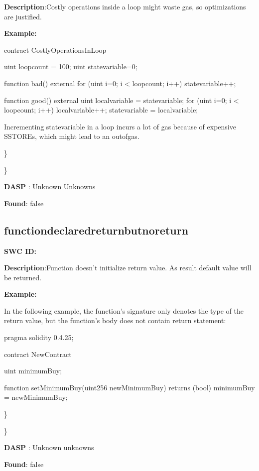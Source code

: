 \documentclass{article}
\begin{document}
{\textbf{Description}:Costly operations inside a loop might waste gas, so optimizations are justified.


\textbf{Example:} 

contract CostlyOperationsInLoop{

    uint loop\textunderscore count = 100;
    uint state\textunderscore variable=0;

    function bad() external{
        for (uint i=0; i < loop\textunderscore count; i++){
            state\textunderscore variable++;
        }
    }

    function good() external{
      uint local\textunderscore variable = state\textunderscore variable;
      for (uint i=0; i < loop\textunderscore count; i++){
        local\textunderscore variable++;
      }
      state\textunderscore variable = local\textunderscore variable;
    }
}
Incrementing state\textunderscore variable in a loop incurs a lot of gas because of expensive SSTOREs, which might lead to an out\textendash of\textendash gas.

\} 

\} 

\textbf{DASP} : Unknown Unknowns

\textbf{Found}: false

\subsection{function\textunderscore declared\textunderscore return\textunderscore but\textunderscore no\textunderscore return} 
\textbf{SWC \textunderscore ID:} 

\textbf{Description}:Function doesn't initialize return value. As result default value will be returned.


\textbf{Example:} 

In the following example, the function's signature only denotes the type of the return value, but the function's body does not contain return statement:

pragma solidity 0.4.25;

contract NewContract {
    uint minimumBuy;

    function setMinimumBuy(uint256 newMinimumBuy) returns (bool){
        minimumBuy = newMinimumBuy;
    }
}

\} 

\} 

\textbf{DASP} : Unknown unknowns

\textbf{Found}: false

}
\end{document}
